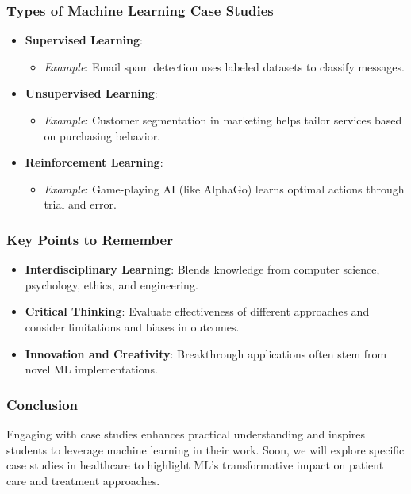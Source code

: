 \documentclass[aspectratio=169]{beamer}
\begin{document}
\begin{frame}[fragile]
    \frametitle{Types of Machine Learning Case Studies}
    \begin{itemize}
        \item \textbf{Supervised Learning}: 
            \begin{itemize}
                \item \textit{Example}: Email spam detection uses labeled datasets to classify messages.
            \end{itemize}
        
        \item \textbf{Unsupervised Learning}: 
            \begin{itemize}
                \item \textit{Example}: Customer segmentation in marketing helps tailor services based on purchasing behavior.
            \end{itemize}
        
        \item \textbf{Reinforcement Learning}: 
            \begin{itemize}
                \item \textit{Example}: Game-playing AI (like AlphaGo) learns optimal actions through trial and error.
            \end{itemize}
    \end{itemize}
\end{frame}

\begin{frame}[fragile]
    \frametitle{Key Points to Remember}
    \begin{itemize}
        \item \textbf{Interdisciplinary Learning}: Blends knowledge from computer science, psychology, ethics, and engineering.
        \item \textbf{Critical Thinking}: Evaluate effectiveness of different approaches and consider limitations and biases in outcomes.
        \item \textbf{Innovation and Creativity}: Breakthrough applications often stem from novel ML implementations.
    \end{itemize}
\end{frame}

\begin{frame}[fragile]
    \frametitle{Conclusion}
    Engaging with case studies enhances practical understanding and inspires students to leverage machine learning in their work. Soon, we will explore specific case studies in healthcare to highlight ML's transformative impact on patient care and treatment approaches.
\end{frame}
\end{document}

